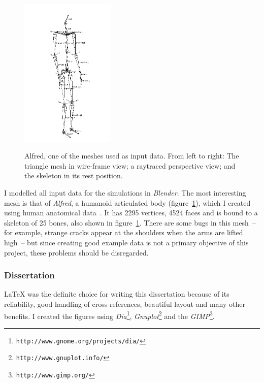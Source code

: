 \begin{figure}
{    \includegraphics[width=45.16mm,height=71.6mm]{figures/alfred-skeleton}}
\caption{Alfred, one of the meshes used as input data. From left to right: The triangle mesh in
    wire-frame view; a raytraced perspective view; and the skeleton in its rest position.
    \label{alfredFigure}}
\end{figure}
I modelled all input data for the simulations in \textsl{Blender}. The most interesting mesh
is that of \emph{Alfred}, a humanoid articulated body (figure~\ref{alfredFigure}), which I created
using human anatomical data~\cite{Anatomy:03}. It has 2295 vertices, 4524 faces and is bound to
a skeleton of 25 bones, also shown in figure~\ref{alfredFigure}. There are some bugs in this
mesh~-- for example, strange cracks appear at the shoulders when the arms are lifted high~-- but
since creating good example data is not a primary objective of this project, these problems
should be disregarded.

\subsubsection{Dissertation}
\LaTeX{} was the definite choice for writing this dissertation because of its reliability,
good handling of cross-references, beautiful layout and many other benefits. I created the
figures using \textsl{Dia}\footnote{\texttt{http://www.gnome.org/projects/dia/}},
\textsl{Gnuplot}\footnote{\texttt{http://www.gnuplot.info/}} and the
\textsl{GIMP}\footnote{\texttt{http://www.gimp.org/}}.
